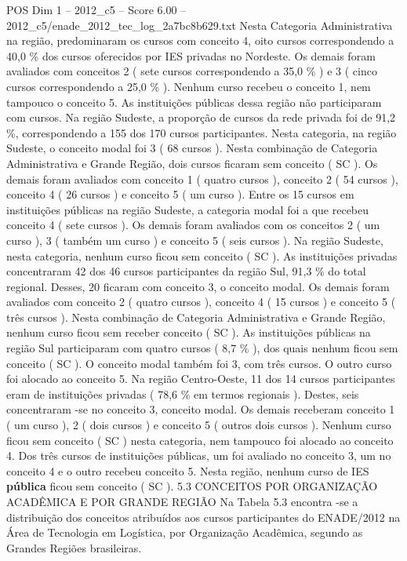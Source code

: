 \begin{textsample}{POS Dim 1 – 2012\_c5 – Score 6.00 – 2012\_c5/enade\_2012\_tec\_log\_2a7bc8b629.txt}
Nesta Categoria Administrativa na região, predominaram os cursos com conceito 4, oito cursos correspondendo a 40,0 \% dos cursos oferecidos por IES privadas no Nordeste.
Os demais foram avaliados com conceitos 2 ( sete cursos correspondendo a 35,0 \% ) e 3 ( cinco cursos correspondendo a 25,0 \% ).
Nenhum curso recebeu o conceito 1, nem tampouco o conceito 5.
As instituições públicas dessa região não participaram com cursos.
Na região Sudeste, a proporção de cursos da rede privada foi de 91,2 \%, correspondendo a 155 dos 170 cursos participantes.
Nesta categoria, na região Sudeste, o conceito modal foi 3 ( 68 cursos ).
Nesta combinação de Categoria Administrativa e Grande Região, dois cursos ficaram sem conceito ( SC ).
Os demais foram avaliados com conceito 1 ( quatro cursos ), conceito 2 ( 54 cursos ), conceito 4 ( 26 cursos ) e conceito 5 ( um curso ).
Entre os 15 cursos em instituições públicas na região Sudeste, a categoria modal foi a que recebeu conceito 4 ( sete cursos ).
Os demais foram avaliados com os conceitos 2 ( um curso ), 3 ( também um curso ) e conceito 5 ( seis cursos ).
Na região Sudeste, nesta categoria, nenhum curso ficou sem conceito ( SC ).
As instituições privadas concentraram 42 dos 46 cursos participantes da região Sul, 91,3 \% do total regional.
Desses, 20 ficaram com conceito 3, o conceito modal.
Os demais foram avaliados com conceito 2 ( quatro cursos ), conceito 4 ( 15 cursos ) e conceito 5 ( três cursos ).
Nesta combinação de Categoria Administrativa e Grande Região, nenhum curso ficou sem receber conceito ( SC ).
As instituições públicas na região Sul participaram com quatro cursos ( 8,7 \% ), dos quais nenhum ficou sem conceito ( SC ).
O conceito modal também foi 3, com três cursos.
O outro curso foi alocado ao conceito 5.
Na região Centro-Oeste, 11 dos 14 cursos participantes eram de instituições privadas ( 78,6 \% em termos regionais ).
Destes, seis concentraram -se no conceito 3, conceito modal.
Os demais receberam conceito 1 ( um curso ), 2 ( dois cursos ) e conceito 5 ( outros dois cursos ).
Nenhum curso ficou sem conceito ( SC ) nesta categoria, nem tampouco foi alocado ao conceito 4.
Dos três cursos de instituições públicas, um foi avaliado no conceito 3, um no conceito 4 e o outro recebeu conceito 5.
Nesta região, nenhum curso de IES \textbf{pública} ficou sem conceito ( SC ). 5.3 CONCEITOS POR ORGANIZAÇÃO ACADÊMICA E POR GRANDE REGIÃO Na Tabela 5.3 encontra -se a distribuição dos conceitos atribuídos aos cursos participantes do ENADE/2012 na Área de Tecnologia em Logística, por Organização Acadêmica, segundo as Grandes Regiões brasileiras.

\end{textsample}
